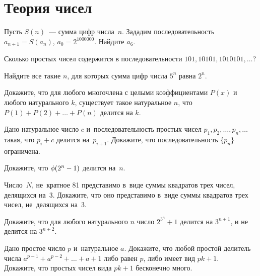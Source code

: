 
\section*{Теория чисел}


\begingroup \def\eulerphi{\mathrm{\phi}}

\begin{problems}

\item
Пусть $S(n)$~--- сумма цифр числа~$n$.
Зададим последовательность $a_{n+1} = S(a_n)$, $a_0 = 2^{1000000}$.
Найдите $a_6$.

\item
Сколько простых чисел содержится в последовательности
$101, 10101, 1010101, \ldots$?

\item
Найдите все такие $n$, для которых сумма цифр числа $5^n$ равна $2^n$.

\item
Докажите, что для любого многочлена с целыми коэффициентами $P(x)$ и любого
натурального $k$, существует такое натуральное $n$, что
$P(1) + P(2) + \ldots + P(n)$ делится на $k$.

\item
Дано натуральное число $c$ и~последовательность простых чисел
$p_1, p_2, \ldots, p_n, \ldots$ такая, что $p_i + c$ делится на~$p_{i+1}$.
Докажите, что последовательность $\{p_n\}$ ограничена.

\item
Докажите, что $\eulerphi(2^n - 1)$ делится на~$n$.

\item
Число~$N$, не~кратное 81 представимо в~виде суммы квадратов трех чисел,
делящихся на~3.
Докажите, что оно представимо в~виде суммы квадратов трех чисел, не~делящихся
на~3.

\item
Докажите, что для любого натурального $n$ число $2^{3^n} + 1$ делится
на $3^{n+1}$, и не делится на $3^{n+2}$.

\item
\subproblem
Дано простое число $p$ и~натуральное $a$.
Докажите, что любой простой делитель числа $a^{p-1} + a^{p-2} + \ldots + a + 1$
либо равен $p$, либо имеет вид $p k + 1$.
\\
\subproblem
Докажите, что простых чисел вида $p k + 1$ бесконечно много.

\end{problems}

\endgroup %

